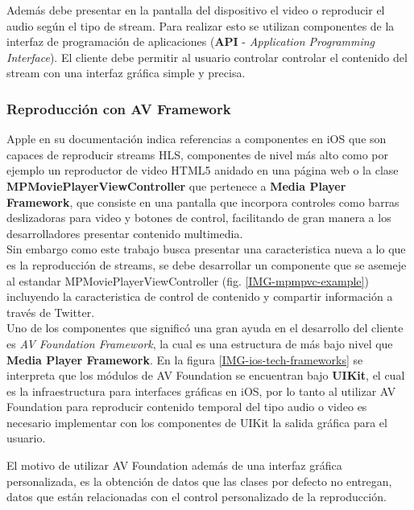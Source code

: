 Además debe presentar en la pantalla del dispositivo el video o reproducir el audio según el tipo de stream. Para realizar esto se utilizan componentes de la interfaz de programación de aplicaciones (\textbf{API} - \textit{Application Programming Interface}). El cliente debe permitir al usuario controlar controlar el contenido del stream con una interfaz gráfica simple y precisa.

		\subsubsection{Reproducción con AV Framework}
Apple en su documentación indica referencias a componentes en iOS que son capaces de reproducir streams HLS, componentes de nivel más alto como por ejemplo un reproductor de video HTML5 anidado en una página web o la clase \textbf{MPMoviePlayerViewController} que pertenece a \textbf{Media Player Framework}, que consiste en una pantalla que incorpora controles como barras deslizadoras para video y botones de control, facilitando de gran manera a los desarrolladores presentar contenido multimedia. \\

Sin embargo como este trabajo busca presentar una caracteristica nueva a lo que es la reproducción de streams, se debe desarrollar un componente que se asemeje al estandar MPMoviePlayerViewController (fig. \ref{IMG-mpmpvc-example}) incluyendo la caracteristica de control de contenido y compartir información a través de Twitter.\\

Uno de los componentes que significó una gran ayuda en el desarrollo del cliente es \textit{AV Foundation Framework}, la cual es una estructura de más bajo nivel que \textbf{Media Player Framework}. 
En la figura \ref{IMG-ios-tech-frameworks} se interpreta que los módulos de AV Foundation se encuentran bajo \textbf{UIKit}, el cual es la infraestructura para interfaces gráficas en iOS, por lo tanto al utilizar AV Foundation para reproducir contenido temporal del tipo audio o video es necesario implementar con los componentes de UIKit la salida gráfica para el usuario.

El motivo de utilizar AV Foundation además de una interfaz gráfica personalizada, es la obtención de datos que las clases por defecto no entregan, datos que están relacionadas con el control personalizado de la reproducción.


